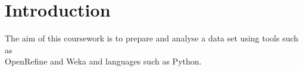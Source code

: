 \graphicspath{{Images/}}

\section{Introduction}

The aim of this coursework is to prepare and analyse a data set using tools such as \\ OpenRefine and Weka and languages such as Python.